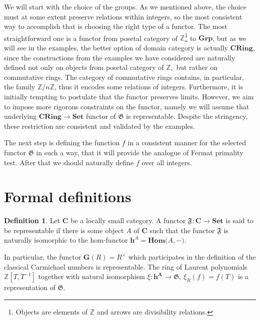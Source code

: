 \documentclass{article}
\theoremstyle{definition}
\theoremstyle{definition}
\newtheorem{definition}{Definition}
\begin{document}
We will start with the choice of the groups. As we mentioned above, the choice must at some extent preserve relations within 
integers, so the most consistent way to accomplish that is choosing the right type of a functor. The most straightforward one is 
a functor from posetal category of $\mathbb{Z}$\footnote{Objects are elements of 
$\mathbb{Z}$ and arrows are divisibility relations.} to $\mathbf{Grp}$, but as we will see in the examples, the better option 
of domain category is actually $\mathbf{CRing}$, since the constructions from the examples we have considered are naturally 
defined not only on objects from posetal category of $\mathbb{Z},$ but rather on commutative rings. The category of commutative 
rings contains, in particular, the family $\mathbb{Z}/n\mathbb{Z}$, thus it encodes some relations of integers. Furthermore, it 
is initially tempting to postulate that the functor preserves limits. However, we aim to impose more rigorous constraints on 
the functor, namely we will assume that underlying $\mathbf{CRing} \xrightarrow{} \mathbf{Set}$ functor of $\mathfrak{G}$ is 
representable. Despite the stringency, these restriction are consistent and validated by the examples. 

The next step is defining the function $f$ in a consistent manner for the selected functor $\mathfrak{G}$ in such a way, that 
it will provide the analogue of Fermat primality test.
After that we should naturally define $f$ over all integers.

\section{Formal definitions}

\begin{definition}
    Let $\mathbf{C}$ be a locally small category. A functor $\mathfrak{F}:\mathbf{C}\xrightarrow{}\mathbf{Set}$ is said to be 
    representable if there is some object $A$ of $\mathbf{C}$ such that the functor $\mathfrak{F}$ is naturally isomorphic to 
    the hom-functor $\mathbf{h}^A = \mathbf{Hom(}A\mathbf{, -)}$.
\end{definition}

In particular, the functor $\mathbf{G}(R)=R^\times$ which participates in the definition of the classical Carmichael numbers 
is representable. The ring of Laurent polynomials $\mathbb{Z}[T, T^{-1}]$ together with natural isomorphism 
$\xi:\mathbf{h^A} \xrightarrow{} \mathfrak{G},\ \xi_R(f)=f(T)$ is a representation of $\mathfrak{G}$.
\end{document}
